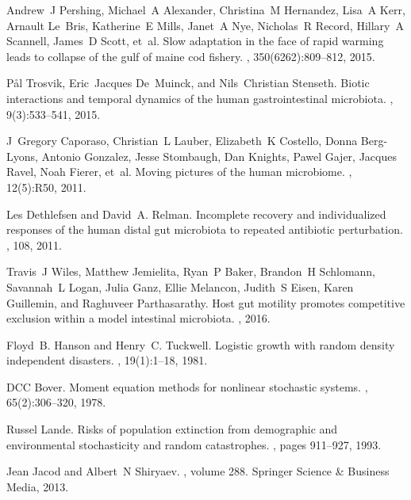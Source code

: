 \begin{thebibliography}{10}
	Andrew~J Pershing, Michael~A Alexander, Christina~M Hernandez, Lisa~A Kerr,
	Arnault Le~Bris, Katherine~E Mills, Janet~A Nye, Nicholas~R Record, Hillary~A
	Scannell, James~D Scott, et~al.
	\newblock Slow adaptation in the face of rapid warming leads to collapse of the
	gulf of maine cod fishery.
	, 350(6262):809--812, 2015.
	
	P{\aa}l Trosvik, Eric~Jacques De~Muinck, and Nils~Christian Stenseth.
	\newblock Biotic interactions and temporal dynamics of the human
	gastrointestinal microbiota.
	, 9(3):533--541, 2015.
	
	J~Gregory Caporaso, Christian~L Lauber, Elizabeth~K Costello, Donna Berg-Lyons,
	Antonio Gonzalez, Jesse Stombaugh, Dan Knights, Pawel Gajer, Jacques Ravel,
	Noah Fierer, et~al.
	\newblock Moving pictures of the human microbiome.
	, 12(5):R50, 2011.
	
	Les Dethlefsen and David~A. Relman.
	\newblock Incomplete recovery and individualized responses of the human distal
	gut microbiota to repeated antibiotic perturbation.
	, 108, 2011.
	
	Travis~J Wiles, Matthew Jemielita, Ryan~P Baker, Brandon~H Schlomann,
	Savannah~L Logan, Julia Ganz, Ellie Melancon, Judith~S Eisen, Karen
	Guillemin, and Raghuveer Parthasarathy.
	\newblock Host gut motility promotes competitive exclusion within a model
	intestinal microbiota.
	, 2016.
	
	Floyd~B. Hanson and Henry~C. Tuckwell.
	\newblock Logistic growth with random density independent disasters.
	, 19(1):1--18, 1981.
	
	DCC Bover.
	\newblock Moment equation methods for nonlinear stochastic systems.
	,
	65(2):306--320, 1978.
	
	Russel Lande.
	\newblock Risks of population extinction from demographic and environmental
	stochasticity and random catastrophes.
	, pages 911--927, 1993.
	
	Jean Jacod and Albert~N Shiryaev.
	, volume 288.
	\newblock Springer Science \& Business Media, 2013.
	

\end{thebibliography}
